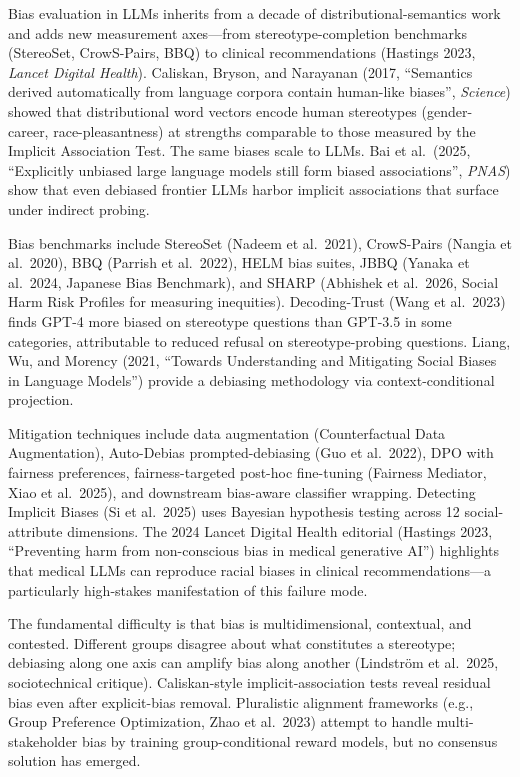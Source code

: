 Bias evaluation in LLMs inherits from a decade of distributional-semantics work and adds new measurement axes---from stereotype-completion benchmarks (StereoSet, CrowS-Pairs, BBQ) to clinical recommendations (Hastings 2023, \emph{Lancet Digital Health}). Caliskan, Bryson, and Narayanan (2017, ``Semantics derived automatically from language corpora contain human-like biases'', \emph{Science}) showed that distributional word vectors encode human stereotypes (gender-career, race-pleasantness) at strengths comparable to those measured by the Implicit Association Test. The same biases scale to LLMs. Bai et al.~(2025, ``Explicitly unbiased large language models still form biased associations'', \emph{PNAS}) show that even debiased frontier LLMs harbor implicit associations that surface under indirect probing.

Bias benchmarks include StereoSet (Nadeem et al.~2021), CrowS-Pairs (Nangia et al.~2020), BBQ (Parrish et al.~2022), HELM bias suites, JBBQ (Yanaka et al.~2024, Japanese Bias Benchmark), and SHARP (Abhishek et al.~2026, Social Harm Risk Profiles for measuring inequities). Decoding-Trust (Wang et al.~2023) finds GPT-4 more biased on stereotype questions than GPT-3.5 in some categories, attributable to reduced refusal on stereotype-probing questions. Liang, Wu, and Morency (2021, ``Towards Understanding and Mitigating Social Biases in Language Models'') provide a debiasing methodology via context-conditional projection.

Mitigation techniques include data augmentation (Counterfactual Data Augmentation), Auto-Debias prompted-debiasing (Guo et al.~2022), DPO with fairness preferences, fairness-targeted post-hoc fine-tuning (Fairness Mediator, Xiao et al.~2025), and downstream bias-aware classifier wrapping. Detecting Implicit Biases (Si et al.~2025) uses Bayesian hypothesis testing across 12 social-attribute dimensions. The 2024 Lancet Digital Health editorial (Hastings 2023, ``Preventing harm from non-conscious bias in medical generative AI'') highlights that medical LLMs can reproduce racial biases in clinical recommendations---a particularly high-stakes manifestation of this failure mode.

The fundamental difficulty is that bias is multidimensional, contextual, and contested. Different groups disagree about what constitutes a stereotype; debiasing along one axis can amplify bias along another (Lindström et al.~2025, sociotechnical critique). Caliskan-style implicit-association tests reveal residual bias even after explicit-bias removal. Pluralistic alignment frameworks (e.g., Group Preference Optimization, Zhao et al.~2023) attempt to handle multi-stakeholder bias by training group-conditional reward models, but no consensus solution has emerged.

